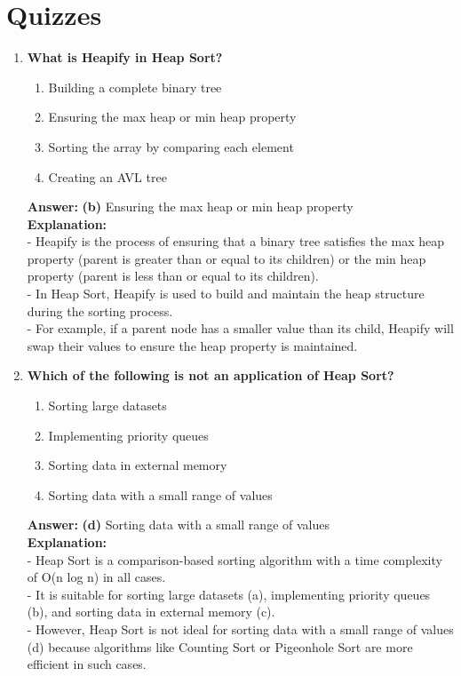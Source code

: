 \section{Quizzes}
\begin{enumerate}
    \item \textbf{What is Heapify in Heap Sort?}
    \begin{enumerate}
            \item Building a complete binary tree
            \item Ensuring the max heap or min heap property
            \item Sorting the array by comparing each element
            \item Creating an AVL tree
        \end{enumerate}
    \textbf{Answer:} \textbf{(b)} Ensuring the max heap or min heap property \\
    \textbf{Explanation:} \\
    - Heapify is the process of ensuring that a binary tree satisfies the max heap property (parent is greater than or equal to its children) or the min heap property (parent is less than or equal to its children). \\
    - In Heap Sort, Heapify is used to build and maintain the heap structure during the sorting process. \\
    - For example, if a parent node has a smaller value than its child, Heapify will swap their values to ensure the heap property is maintained.
    
    \item \textbf{Which of the following is not an application of Heap Sort?}
    \begin{enumerate}
        \item Sorting large datasets
        \item Implementing priority queues
        \item Sorting data in external memory
        \item Sorting data with a small range of values
    \end{enumerate}
    \textbf{Answer:} \textbf{(d)} Sorting data with a small range of values \\
    \textbf{Explanation:} \\
    - Heap Sort is a comparison-based sorting algorithm with a time complexity of O(n log n) in all cases. \\
    - It is suitable for sorting large datasets (a), implementing priority queues (b), and sorting data in external memory (c). \\
    - However, Heap Sort is not ideal for sorting data with a small range of values (d) because algorithms like Counting Sort or Pigeonhole Sort are more efficient in such cases.
    

\end{enumerate}

